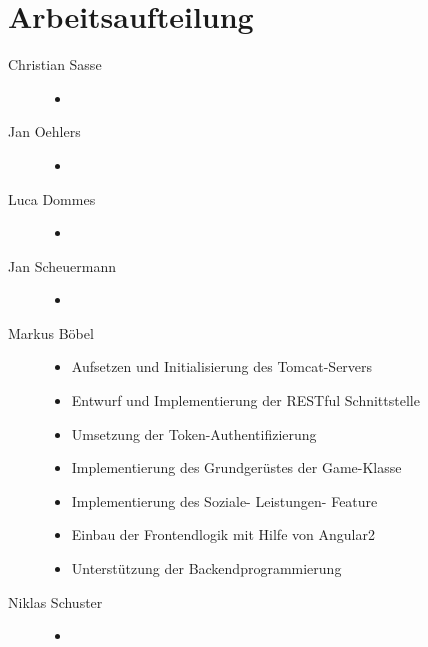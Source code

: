 \chapter*{Arbeitsaufteilung}



\begin{description} 
	
		\item[Christian Sasse]
		\begin{itemize} 
			\item 
		\end{itemize}
	
		\item[Jan Oehlers]
		\begin{itemize} 
			\item 
		\end{itemize}
	
		\item[Luca Dommes]
		\begin{itemize} 
			\item 
		\end{itemize}
		
			\item[Jan Scheuermann]
		\begin{itemize} 
			\item 
		\end{itemize}


		\item[Markus Böbel] 
		\begin{itemize} 
			\item Aufsetzen und Initialisierung des Tomcat-Servers
			\item Entwurf und Implementierung der RESTful Schnittstelle
			\item Umsetzung der Token-Authentifizierung
			\item Implementierung des Grundgerüstes der Game-Klasse
			\item Implementierung des Soziale- Leistungen- Feature
			\item Einbau der Frontendlogik mit Hilfe von Angular2
			\item Unterstützung der Backendprogrammierung
		\end{itemize}
		
		\item[Niklas Schuster]
		\begin{itemize} 
			\item 
		\end{itemize}
\end{description}